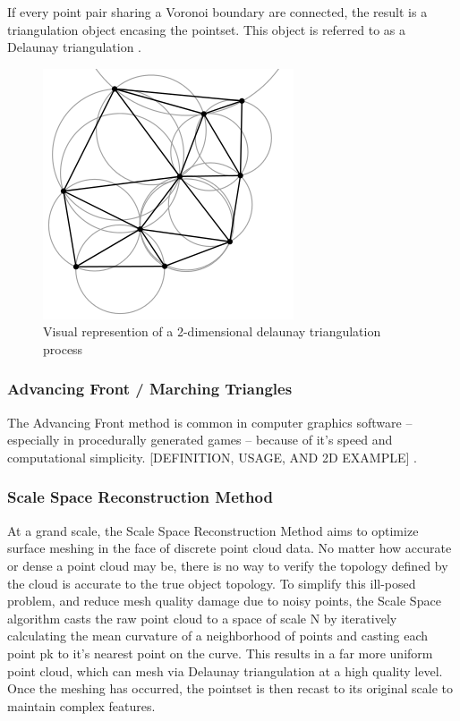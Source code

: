 \documentclass[12pt]{drexelthesis}
\let\Oldsubsubsection\subsubsection
\renewcommand{\subsubsection}{\FloatBarrier\Oldsubsubsection}
\begin{document}
If every point pair sharing a Voronoi boundary are connected, the result is a triangulation object encasing the pointset. This object is referred to as a Delaunay triangulation \cite{RN65}.

\begin{figure}[!h]
\centering
\includegraphics{delaunay.png}
\caption[2D delaunay triangulation]{\centering Visual represention of a 2-dimensional delaunay triangulation process}
\end{figure}

\subsubsection{Advancing Front / Marching Triangles}
The Advancing Front method is common in computer graphics software – especially in procedurally generated games – because of it’s speed and computational simplicity.
[DEFINITION, USAGE, AND 2D EXAMPLE]
\cite{RN54}.

\subsubsection{Scale Space Reconstruction Method}
At a grand scale, the Scale Space Reconstruction Method aims to optimize surface meshing in the face of discrete point cloud data. No matter how accurate or dense a point cloud may be, there is no way to verify the topology defined by the cloud is accurate to the true object topology. To simplify this ill-posed problem, and reduce mesh quality damage due to noisy points, the Scale Space algorithm casts the raw point cloud to a space of scale N by iteratively calculating the mean curvature of a neighborhood of points and casting each point pk to it’s nearest point on the curve. This results in a far more uniform point cloud, which can mesh via Delaunay triangulation at a high quality level. Once the meshing has occurred, the pointset is then recast to its original scale to maintain complex features. 
\end{document}
